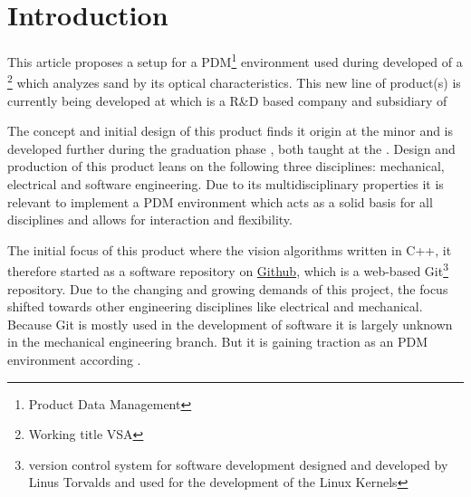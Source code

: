 \documentclass[fleqn,10pt]{SelfArx} %
\affiliation{\textsuperscript{1}\textit{Department of Engineering, HAN University of Applied Sciences, Arnhem, the Netherlands}} %
\affiliation{*\textbf{Corresponding author}: \href{mailto:spijker.jelle@gmail.com}{\color{color1}spijker.jelle@gmail.com}} %
\begin{document}
\flushbottom %

\maketitle %

\tableofcontents %

\thispagestyle{empty} %


\section*{Introduction} %
This article proposes a setup for a PDM\footnote{Product Data Management} environment used during developed of a \vsa\footnote{Working title VSA} which analyzes sand by its optical characteristics. This new line of product(s) is currently being developed at \href{http://www.mtiholland.com/}{\color{color1}\mti} which is a R\&D based company and subsidiary of \href{http://www.ihcmerwede.com/}{\color{color1}\ihc}

The concept and initial design of this product finds it origin at the minor \evd and is developed further during the graduation phase \wtb, both taught at the \href{http://www.han.nl/international/english/}{\color{color1}\instutionname}. Design and production of this product leans on the following three disciplines: mechanical, electrical and software engineering. Due to its multidisciplinary properties it is relevant to implement a PDM environment which acts as a solid basis for all disciplines and allows for interaction and flexibility. 

The initial focus of this product where the vision algorithms written in C++, it therefore started as a software repository on \href{https://github.com/}{\color{color1}Github}, which is a web-based Git\footnote{version control system for software development designed and developed by Linus Torvalds and used for the development of the Linux Kernels} repository. Due to the changing and growing demands of this project, the focus shifted towards other engineering disciplines like electrical and mechanical. Because Git is mostly used in the development of software it is largely unknown in the mechanical engineering branch. But it is gaining traction as an PDM environment according \citeauthor{oleg_github_2013}\cite{oleg_github_2013}. 
\end{document}
